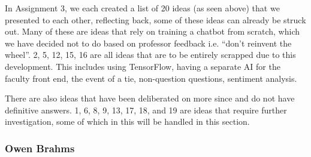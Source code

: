 \documentclass[titlepage, 12pt]{article}
\begin{document}
In Assignment 3, we each created a list of 20 ideas (as seen above) that we presented to each other, reflecting back, some of these ideas can already be struck out. Many of these are ideas that rely on training a chatbot from scratch, which we have decided not to do based on professor feedback i.e. “don’t reinvent the wheel”.  2, 5, 12, 15, 16 are all ideas that are to be entirely scrapped due to this development. This includes using TensorFlow, having a separate AI for the faculty front end, the event of a tie, non-question questions, sentiment analysis. 

There are also ideas that have been deliberated on more since and do not have definitive answers. 1, 6, 8, 9, 13, 17, 18, and 19 are ideas that require further investigation, some of which in this will be handled in this section.

\subsubsection{Owen Brahms}
\end{document}

